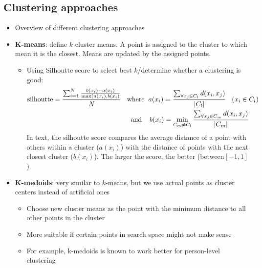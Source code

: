 \subsection{Clustering approaches}
\begin{itemize}
	\item Overview of different clustering approaches
	\item \textbf{K-means}: define $k$ cluster means. A point is assigned to the cluster to which mean it is the closest. Means are updated by the assigned points.
	\begin{itemize}
		\item Using Silhoutte score to select best $k$/determine whether a clustering is good:
		\begin{equation*}
			\begin{split}
				\text{silhoutte} = \frac{\sum_{i=1}^{N}\frac{b(x_i) - a(x_i)}{\max(a(x_i), b(x_i)}}{N}\hspace{3mm} & \text{where}\hspace{2mm} a(x_i)=\frac{\sum_{\forall x_j \in C_l} d(x_i, x_j)}{|C_l|} \hspace{3mm} \text{(} x_i\in C_l\text{)}\\
				& \hspace{2mm}\text{and} \hspace{4mm} b(x_i) = \min_{C_m \neq C_l}\frac{\sum_{\forall x_j \in C_m} d(x_i, x_j)}{|C_m|}
			\end{split}
		\end{equation*}
		In text, the silhoutte score compares the average distance of a point with others within a cluster ($a(x_i)$) with the distance of points with the next closest cluster ($b(x_i)$). The larger the score, the better (between$[-1,1]$)
	\end{itemize}
	\item \textbf{K-medoids}: very similar to $k$-means, but we use actual points as cluster centers instead of artificial ones
	\begin{itemize}
		\item Choose new cluster means as the point with the minimum distance to all other points in the cluster
		\item More suitable if certain points in search space might not make sense
		\item For example, k-medoids is known to work better for person-level clustering
	\end{itemize}
\end{itemize}
